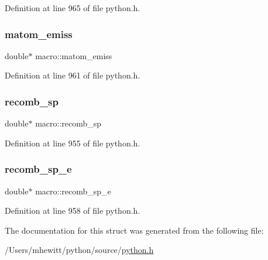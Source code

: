 Definition at line 965 of file python.\+h.

\mbox{\label{structmacro_af1f77da4f0d619ccdf0721133c93a5e8}} 
\subsubsection{\texorpdfstring{matom\+\_\+emiss}{matom\_emiss}}
{\footnotesize\ttfamily double$\ast$ macro\+::matom\+\_\+emiss}



Definition at line 961 of file python.\+h.

\mbox{\label{structmacro_aa33a4e57be212a9a8f49edf6660350cb}} 
\subsubsection{\texorpdfstring{recomb\+\_\+sp}{recomb\_sp}}
{\footnotesize\ttfamily double$\ast$ macro\+::recomb\+\_\+sp}



Definition at line 955 of file python.\+h.

\mbox{\label{structmacro_a13217cd83bb2aff404860f1eea75d18e}} 
\subsubsection{\texorpdfstring{recomb\+\_\+sp\+\_\+e}{recomb\_sp\_e}}
{\footnotesize\ttfamily double$\ast$ macro\+::recomb\+\_\+sp\+\_\+e}



Definition at line 958 of file python.\+h.



The documentation for this struct was generated from the following file\+:\begin{DoxyCompactItemize}
\item 
/\+Users/mhewitt/python/source/\hyperlink{python_8h}{python.\+h}\end{DoxyCompactItemize}
